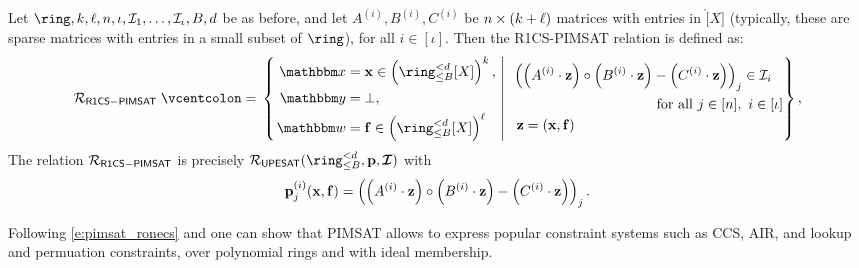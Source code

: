 \documentclass[11pt,letterpaper,usenames,dvipsnames]{article}
\begin{document}
\newcommand{\ronecsideal}{\Relation_{\mathsf{R1CS-PIMSAT}}}
\begin{example}\label{e:pimsat_ronecs}
Let $\ring,\inplen,\codedim,\numrows,\iota, \ideal_1, \ldots, \ideal_{\iota}, B, \moduledegree$ be as before, and let $A^{(i)},B^{(i)},C^{(i)}$ be $n \times (k+\ell)$ matrices with entries in $\ring[X]$ (typically, these are sparse matrices with entries in a small subset of $\ring$), for all $i\in [\iota]$. Then the R1CS-PIMSAT relation is defined as:
    $$
\ronecsideal \defeq \left\{\left. 
\begin{aligned}
    \inp &= \xx\in \left(\ringtwobounds{B}{\moduledegree}[X]\right)^{\inplen},\\
    \oracle &= \bot,\\
    \wit &=\bff \in \left(\ringtwobounds{B}{\moduledegree}[X]\right)^\codedim
\end{aligned} 
\ \right| \ 
\begin{aligned}
 &\left(\left(A^{(i)}\cdot \zz\right)\circ \left(B^{(i)}\cdot \zz\right) - \left(C^{(i)}\cdot \zz\right)\right)_{j} \in \ideal_i \\ &\qquad\qquad \qquad \qquad \qquad \text{ for all } j\in [\numrows], \ i \in [\iota]\\
    &\ \zz=(\xx, \bff)
\end{aligned}
\right\},
$$
The relation $\ronecsideal$ is  precisely $\PIMSAT(\ringtwobounds{B}{\moduledegree}, \pp,\bm{\ideal})$ with $$\mathbf{p}_{j}^{(i)}(\mathbf{x},\mathbf{f})= \left(\left(A^{(i)}\cdot \mathbf{z}\right)\circ \left(B^{(i)}\cdot \mathbf{z}\right) - \left(C^{(i)}\cdot \mathbf{z}\right)\right)_{j}.$$
\end{example}
%
Following  \cref{e:pimsat_ronecs} and \cite{linear-accumulation,zinc,zincplus} one can  show that PIMSAT allows to express  popular constraint systems such as CCS, AIR, and lookup and permuation constraints, over polynomial rings and with ideal membership.
\end{document}
